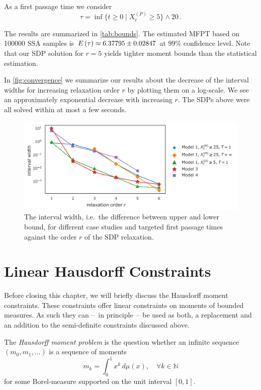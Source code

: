 As a first passage time we consider
\[
  \tau=\inf\{t\geq 0\mid X_t^{(P)} \geq 5\}\land 20\,.
\]

The results are summarized in \autoref{tab:bounds}.
The estimated \ac{MFPT} based on \num{100000}
\ac{SSA} samples is ${E}\left(\tau\right)\approx 6.37795\pm0.02847$ at $99\%$
confidence level.
Note that our \ac{SDP} solution for $r=5$ yields tighter moment bounds than
the statistical estimation.%

In \autoref{fig:convergence} we summarize our results about the
decrease of the interval widths for increasing relaxation order $r$
by plotting them on a log-scale.
We see an approximately exponential decrease with increasing $r$.
The \acp{SDP} above were all solved within at most a few seconds.
\begin{figure}[t]
  \centering
  \includegraphics[width=\textwidth]{gfx/convergence.pdf}
  \caption[\ac{MFPT} bound convergence]{The interval width, i.e.\ the
    difference between upper and lower bound,
    for different case studies and targeted first passage times
    against the order $r$
  of the \ac{SDP} relaxation.\label{fig:convergence}}
\end{figure}

\section{Linear Hausdorff Constraints}\label{sec:hausdorff}
Before closing this chapter, we will briefly discuss the Hausdorff
moment constraints.
These constraints offer linear constraints on moments of bounded measures.
As such they can --~in principle~-- be used as both, a replacement
and an addition to the semi-definite constraints discussed above.

The \emph{Hausdorff moment problem} is the question whether an
infinite sequence $(m_0, m_1, \dotsc)$ is a sequence of moments
\[
  m_k = \int_{0}^{1} x^k\,d\mu(x), \quad \forall k\in\mathbb{N}
\]
for some Borel-measure supported on the unit interval $[0,1]$.

